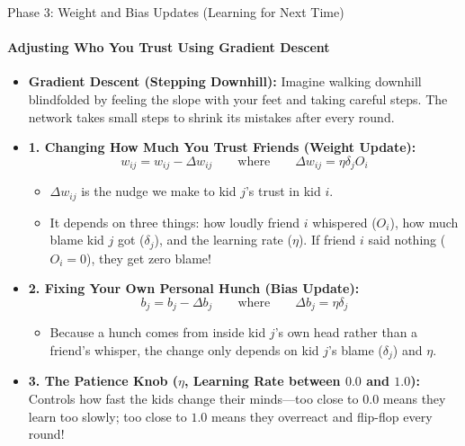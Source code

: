 \documentclass[aspectratio=169]{beamer}
\begin{document}
\begin{frame}{Phase 3: Weight and Bias Updates (Learning for Next Time)}
\framesubtitle{Adjusting Who You Trust Using Gradient Descent}

\begin{itemize}
    \scriptsize
    \item \textbf{Gradient Descent (Stepping Downhill):}
    Imagine walking downhill blindfolded by feeling the slope with your feet and taking careful steps. The network takes small steps to shrink its mistakes after every round.

    \item \textbf{1. Changing How Much You Trust Friends (Weight Update):}
    \[
        w_{ij} = w_{ij} - \Delta w_{ij} \qquad \text{where} \qquad \Delta w_{ij} = \eta \delta_j O_i
    \]
    \vspace{-5mm}
    \begin{itemize}
        \scriptsize
        \item $\Delta w_{ij}$ is the nudge we make to kid $j$'s trust in kid $i$.
        \item It depends on three things: how loudly friend $i$ whispered ($O_i$), how much blame kid $j$ got ($\delta_j$), and the learning rate ($\eta$). If friend $i$ said nothing ($O_i = 0$), they get zero blame!
    \end{itemize}

    \item \textbf{2. Fixing Your Own Personal Hunch (Bias Update):}
    \[
        b_j = b_j - \Delta b_j \qquad \text{where} \qquad \Delta b_j = \eta \delta_j
    \]
    \vspace{-5mm}
    \begin{itemize}
        \scriptsize
        \item Because a hunch comes from inside kid $j$'s own head rather than a friend's whisper, the change only depends on kid $j$'s blame ($\delta_j$) and $\eta$.
    \end{itemize}

    \item \textbf{3. The Patience Knob ($\eta$, Learning Rate between $0.0$ and $1.0$):}
    Controls how fast the kids change their minds—too close to $0.0$ means they learn too slowly; too close to $1.0$ means they overreact and flip-flop every round!
\end{itemize}
\end{frame}
\end{document}
